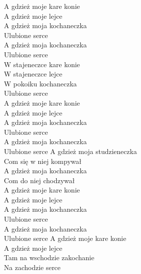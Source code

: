 
\begin{flushleft}
\hspace{0.9cm}A gdzież moje kare konie\\
\hspace{0.9cm}A gdzież moje lejce\\
\hspace{0.9cm}A gdzież moja kochaneczka\\
\hspace{0.9cm}Ulubione serce\\
\hspace{0.9cm}A gdzież moja kochaneczka\\
\hspace{0.9cm}Ulubione serce\\
\hop
W stajeneczce kare konie\\
W stajeneczce lejce\\
W pokoiku kochaneczka\\
Ulubione serce\\
\hop
\hspace{0.9cm}A gdzież moje kare konie \tab{}\\
\hspace{0.9cm}A gdzież moje lejce \tab{}\\
\hspace{0.9cm}A gdzież moja kochaneczka \\
\hspace{0.9cm}Ulubione serce \tab{}\\
\hspace{0.9cm}A gdzież moja kochaneczka \\
\hspace{0.9cm}Ulubione serce \tab{}
\hop
A gdzież moja studzieneczka\\
Com się w niej kompywał\\
A gdzież moja kochaneczka\\
Com do niej chodzywał\\
\hop
\hspace{0.9cm}A gdzież moje kare konie \tab{}\\
\hspace{0.9cm}A gdzież moje lejce \tab{}\\
\hspace{0.9cm}A gdzież moja kochaneczka \\
\hspace{0.9cm}Ulubione serce \tab{}\\
\hspace{0.9cm}A gdzież moja kochaneczka \\
\hspace{0.9cm}Ulubione serce \tab{}
\hop
A gdzież moje kare konie\\
A gdzież moje lejce\\
Tam na wschodzie zakochanie\\
Na zachodzie serce\\

\end{flushleft}
\newpage